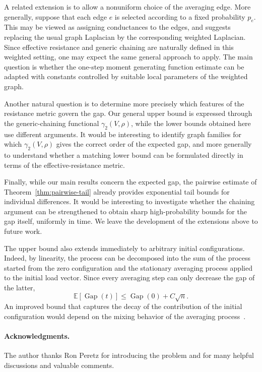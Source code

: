 \documentclass[11pt]{article}
\numberwithin{equation}{section}
\newcommand{\E}{\mathbb{E}}
\newcommand{\1}{\mathbf{1}}
\newcommand{\Gap}{\operatorname{Gap}}
\begin{document}
\medskip

A related extension is to allow a nonuniform choice of the averaging edge. More generally, suppose that each edge \(e\) is selected according to a fixed probability \(p_e\). This may be viewed as assigning conductances to the edges, and suggests replacing the usual graph Laplacian by the corresponding weighted Laplacian. Since effective resistance and generic chaining are naturally defined in this weighted setting, one may expect the same general approach to apply. The main question is whether the one-step moment generating function estimate can be adapted with constants controlled by suitable local parameters of the weighted graph.

\medskip

Another natural question is to determine more precisely which features of the resistance metric govern the gap. Our general upper bound is expressed through the generic-chaining functional
\(\gamma_2(V,\rho)\), while the lower bounds obtained here use different arguments. It would be interesting to identify graph families for which \(\gamma_2(V,\rho)\) gives the correct order of the expected gap, and more generally to understand whether a matching lower bound can be formulated directly in terms of the effective-resistance metric.

\medskip

Finally, while our main results concern the expected gap, the pairwise estimate of Theorem~\ref{thm:pairwise-tail} already provides exponential tail bounds for individual differences. It would be interesting to investigate whether the chaining argument can be strengthened to obtain sharp high-probability bounds for the gap itself, uniformly in time. We leave the development of the extensions above to future work.

\medskip

The upper bound also extends immediately to arbitrary initial configurations. Indeed, by linearity, the process can be decomposed into the sum of the process started from the zero configuration and the stationary averaging process applied to the initial load vector. Since every averaging step can only decrease the gap of the latter,
\[
\E[\Gap(t)]
\le
\Gap(0)+C\sqrt n.
\]
An improved bound that captures the decay of the contribution of the initial configuration would depend on the mixing behavior of the averaging process~\cite{SauerwaldSun}.

\paragraph{Acknowledgments.}
The author thanks Ron Peretz for introducing the problem and for many helpful discussions and valuable comments.
\end{document}
